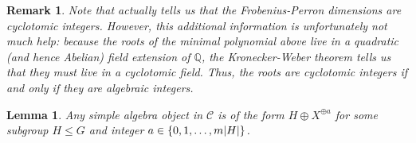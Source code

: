 \documentclass[12pt, reqno]{amsart}
\numberwithin{equation}{section}
\theoremstyle{plainspace}
\newtheorem{lemma}[theorem]{Lemma}
\theoremstyle{definitionspace}
\theoremstyle{remarkspace}
\newtheorem{remark}[theorem]{Remark}
\DeclarePairedDelimiter{\abs}{\lvert}{\rvert}
\newcommand{\mathcat}[1]{\mathcal{#1}}
\begin{document}
\begin{remark}\label{rem:near-group_cyclotomic_integer}
Note that \cite[Corollary 8.54]{Etingof_2005} actually tells us that the Frobenius-Perron dimensions are cyclotomic integers. However, this additional information is unfortunately not much help: because the roots of the minimal polynomial above live in a quadratic (and hence Abelian) field extension of $\mathbb{Q}$, the Kronecker-Weber theorem tells us that they must live in a cyclotomic field. Thus, the roots are cyclotomic integers if and only if they are algebraic integers.
\end{remark}
\leavevmode

\begin{lemma}\label{lem:near-group_algebra_candidates}
Any simple algebra object in $\mathcat{C}$ is of the form $H \oplus X^{\oplus a}$ for some subgroup $H \leq G$ and integer $a \in \{0, 1, \dots, m\abs{H}\}$.
\end{lemma}
\leavevmode\newline
\end{document}
